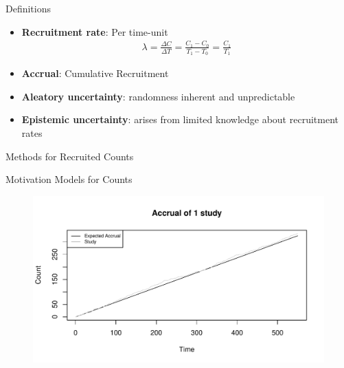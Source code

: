 \documentclass[english]{beamer}\usepackage[]{graphicx}\usepackage[]{xcolor}
\makeatletter
\def\maxwidth{ %
  \ifdim\Gin@nat@width>\linewidth
    \linewidth
  \else
    \Gin@nat@width
  \fi
}
\newenvironment{knitrout}{}{} %
\makeatother
\begin{document}
\begin{frame}{Definitions}

\begin{itemize}[label = ]
\item \textbf{Recruitment rate}: Per time-unit \citep{piantadosi2024clinical}
\begin{align*}
\lambda = \frac{\Delta C}{\Delta T} = \frac{C_1 - C_0}{T_1 - T_0} = \frac{C_1}{T_1}
\end{align*}

\item \textbf{Accrual}: Cumulative Recruitment
\item \textbf{Aleatory uncertainty}: randomness inherent and unpredictable
\item \textbf{Epistemic uncertainty}: arises from limited knowledge about recruitment rates



\end{itemize}


\end{frame}

\begin{frame}{Methods for Recruited Counts}

\end{frame}

\begin{frame}{Motivation Models for Counts}
\begin{figure}
\begin{knitrout}
\color{fgcolor}
\includegraphics[width=\maxwidth]{figures/figunnamed-chunk-2-1} 
\end{knitrout}

\end{figure}

\end{frame}
\end{document}
